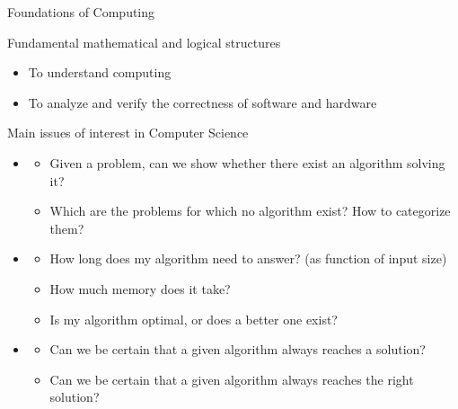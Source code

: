 \begin{frame}{Foundations of Computing}
  \begin{block}{Fundamental mathematical and logical structures}
    \begin{itemize}
    \item To understand computing
    \item To analyze and verify the correctness of software and hardware
    \end{itemize}
  \end{block}

  \begin{block}{Main issues of interest in Computer Science}
    \begin{itemize}
    \item {}
      \begin{itemize}
      \item Given a problem, can we show whether there exist an
        algorithm solving it?
      \item Which are the problems for which no algorithm exist? How to
        categorize them?
      \end{itemize}
    \item {}
      \begin{itemize}
      \item How long does my algorithm need to answer? (as function
        of input size)
      \item How much memory does it take?
      \item Is my algorithm optimal, or does a better one exist?
      \end{itemize}
    \item {}
      \begin{itemize}
      \item Can we be certain that a given algorithm always reaches a solution?
      \item Can we be certain that a given algorithm always reaches
        the right solution?
      \end{itemize}
    \end{itemize}
  \end{block}
\end{frame}
